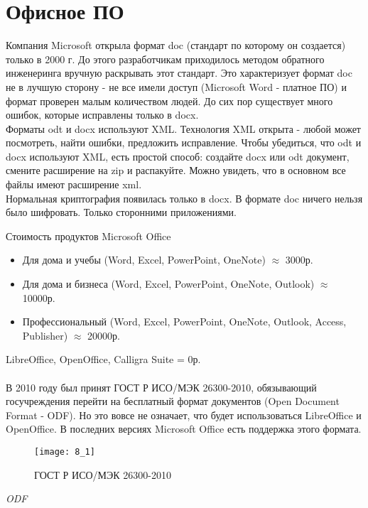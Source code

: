 \section{Офисное ПО}
Компания Microsoft открыла формат doc (стандарт по которому он создается) только в 2000 г. До этого разработчикам приходилось методом обратного инженеринга вручную раскрывать этот стандарт. Это характеризует формат doc не в лучшую сторону - не все имели доступ (Microsoft Word - платное ПО) и формат проверен малым количеством людей. До сих пор существует много ошибок, которые исправлены только в docx.
\\Форматы odt и docx используют XML. Технология XML открыта - любой может посмотреть, найти ошибки, предложить исправление. Чтобы убедиться, что odt и docx используют XML, есть простой способ: создайте docx или odt документ, смените расширение на zip и распакуйте. Можно увидеть, что в основном все файлы имеют расширение xml.
\\Нормальная криптография появилась только в docx. В формате doc ничего нельзя было шифровать. Только сторонними приложениями.
\\
\begin{center}
Стоимость продуктов Microsoft Office
\end{center}
\begin{itemize}
  \item Для дома и учебы (Word, Excel, PowerPoint, OneNote) $\approx$ 3000р.
  \item Для дома и бизнеса (Word, Excel, PowerPoint, OneNote, Outlook) $\approx$ 10000р.
  \item Профессиональный (Word, Excel, PowerPoint, OneNote, Outlook, Access, Publisher) $\approx$ 20000р.
\end{itemize}
LibreOffice, OpenOffice, Calligra Suite = 0р.
\\
\\В 2010 году был принят ГОСТ Р ИСО/МЭК 26300-2010, обязывающий госучреждения перейти на бесплатный формат документов (Open Document Format - ODF). Но это вовсе не означает, что будет использоваться LibreOffice и OpenOffice. В последних версиях Microsoft Office есть поддержка этого формата.
\begin{figure}
\texttt{[image: 8\_1]}
\caption{ГОСТ Р ИСО/МЭК 26300-2010}
\end{figure}
\begin{center}
\emph{ ODF}
\end{center}

